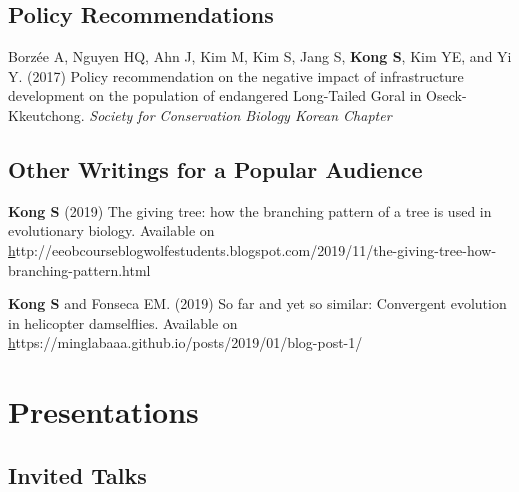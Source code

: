 \documentclass[11pt]{article}
\begin{document}
\subsection*{Policy Recommendations}
\begin{etaremune}


\item Borzée A, Nguyen HQ, Ahn J, Kim M, Kim S, Jang S, \textbf{Kong S}, Kim YE, and Yi Y. (2017) Policy recommendation on the negative impact of infrastructure development on the population of endangered Long-Tailed Goral in Oseck-Kkeutchong. \textit{Society for Conservation Biology Korean Chapter}

\end{etaremune}

\subsection*{Other Writings for a Popular Audience}
\begin{etaremune}

\item \textbf{Kong S} (2019) The giving tree: how the branching pattern of a tree is used in evolutionary biology. Available on \href{http://eeobcourseblogwolfestudents.blogspot.com/2019/11/the-giving-tree-how-branching-pattern.html}http://eeobcourseblogwolfestudents.blogspot.com/2019/11/the-giving-tree-how-branching-pattern.html
\item \textbf{Kong S} and Fonseca  EM. (2019) So far and yet so similar: Convergent evolution in helicopter damselflies. Available on \href{https://minglabaaa.github.io/posts/2019/01/blog-post-1/}https://minglabaaa.github.io/posts/2019/01/blog-post-1/



\end{etaremune}

\hspace{0pt}











\section*{Presentations}

\subsection*{Invited Talks}
\end{document}
